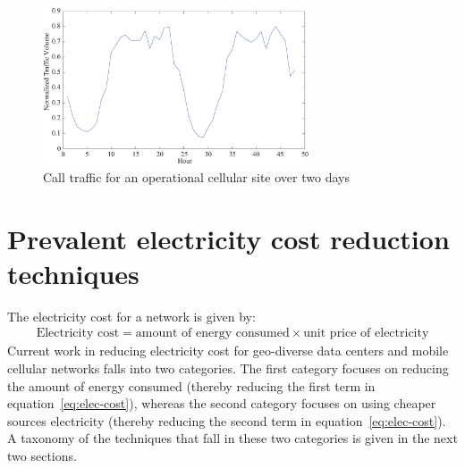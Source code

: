 \begin{figure}
\centering
\includegraphics[width=0.7\textwidth]{pics/waridworkload.eps}
\caption{Call traffic for an operational cellular site over two days}
\label{fig:varwork}
\end{figure} 

\section{Prevalent electricity cost reduction techniques} %

The electricity cost for a network is given by:
\begin{align}
\text{Electricity cost} = \text{amount of energy consumed} \times \text{unit price of electricity}
\label{eq:elec-cost}
\end{align}
Current work in reducing electricity cost for geo-diverse data centers and mobile cellular networks falls into two categories. The first category focuses on reducing the amount of energy consumed (thereby reducing the first term in equation~\ref{eq:elec-cost}), whereas the second category focuses on using cheaper sources electricity (thereby reducing the second term in equation~\ref{eq:elec-cost}). A taxonomy of the techniques that fall in these two categories is given in the next two sections.


